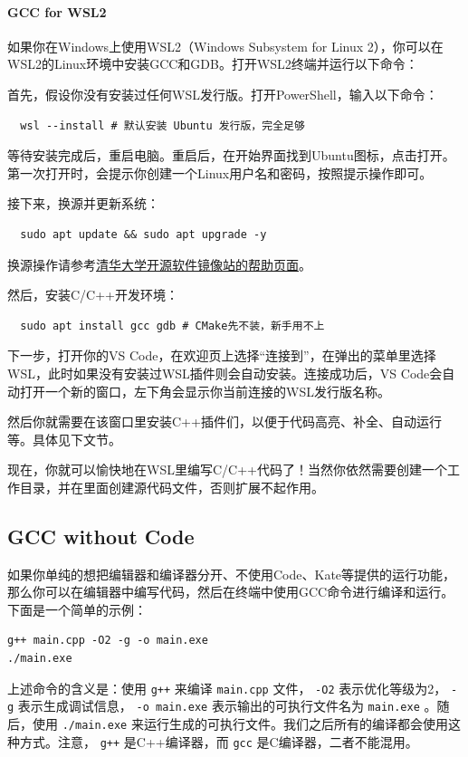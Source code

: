 \paragraph{GCC for WSL2} 如果你在Windows上使用WSL2（Windows Subsystem for Linux 2），你可以在WSL2的Linux环境中安装GCC和GDB。打开WSL2终端并运行以下命令：

首先，假设你没有安装过任何WSL发行版。打开PowerShell，输入以下命令：
\begin{verbatim}
  wsl --install # 默认安装 Ubuntu 发行版，完全足够
\end{verbatim}
等待安装完成后，重启电脑。重启后，在开始界面找到Ubuntu图标，点击打开。第一次打开时，会提示你创建一个Linux用户名和密码，按照提示操作即可。

接下来，换源并更新系统：
\begin{verbatim}
  sudo apt update && sudo apt upgrade -y
\end{verbatim}
换源操作请参考\href{https://mirrors.tuna.tsinghua.edu.cn/help/ubuntu/}{清华大学开源软件镜像站的帮助页面}。

然后，安装C/C++开发环境：
\begin{verbatim}
  sudo apt install gcc gdb # CMake先不装，新手用不上
\end{verbatim}

下一步，打开你的VS Code，在欢迎页上选择“连接到”，在弹出的菜单里选择WSL，此时如果没有安装过WSL插件则会自动安装。连接成功后，VS Code会自动打开一个新的窗口，左下角会显示你当前连接的WSL发行版名称。

然后你就需要在该窗口里安装C++插件们，以便于代码高亮、补全、自动运行等。具体见下文节。

现在，你就可以愉快地在WSL里编写C/C++代码了！当然你依然需要创建一个工作目录，并在里面创建源代码文件，否则扩展不起作用。

\subsection{GCC without Code} 如果你单纯的想把编辑器和编译器分开、不使用Code、Kate等提供的运行功能，那么你可以在编辑器中编写代码，然后在终端中使用GCC命令进行编译和运行。下面是一个简单的示例：
\begin{verbatim}
g++ main.cpp -O2 -g -o main.exe
./main.exe
\end{verbatim}
上述命令的含义是：使用 \texttt{g++} 来编译 \verb|main.cpp| 文件， \texttt{-O2} 表示优化等级为2， \texttt{-g} 表示生成调试信息， \texttt{-o main.exe} 表示输出的可执行文件名为 \verb|main.exe| 。随后，使用 \texttt{./main.exe} 来运行生成的可执行文件。我们之后所有的编译都会使用这种方式。注意， \texttt{g++} 是C++编译器，而 \texttt{gcc} 是C编译器，二者不能混用。

